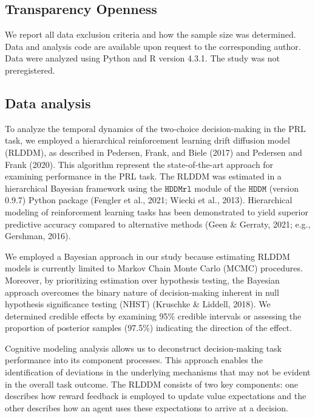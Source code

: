\documentclass[
  man,floatsintext]{apa6}
\begin{document}
\hypertarget{transparency-openness}{%
\subsection{Transparency Openness}\label{transparency-openness}}

We report all data exclusion criteria and how the sample size was determined. Data and analysis code are available upon request to the corresponding author. Data were analyzed using Python and R version 4.3.1. The study was not preregistered.

\hypertarget{data-analysis}{%
\subsection{Data analysis}\label{data-analysis}}

To analyze the temporal dynamics of the two-choice decision-making in the PRL task, we employed a hierarchical reinforcement learning drift diffusion model (RLDDM), as described in Pedersen, Frank, and Biele (2017) and Pedersen and Frank (2020). This algorithm represent the state-of-the-art approach for examining performance in the PRL task. The RLDDM was estimated in a hierarchical Bayesian framework using the \(\texttt{HDDMrl}\) module of the \(\texttt{HDDM}\) (version 0.9.7) Python package (Fengler et al., 2021; Wiecki et al., 2013). Hierarchical modeling of reinforcement learning tasks has been demonstrated to yield superior predictive accuracy compared to alternative methods (Geen \& Gerraty, 2021; e.g., Gershman, 2016).

We employed a Bayesian approach in our study because estimating RLDDM models is currently limited to Markov Chain Monte Carlo (MCMC) procedures. Moreover, by prioritizing estimation over hypothesis testing, the Bayesian approach overcomes the binary nature of decision-making inherent in null hypothesis significance testing (NHST) (Kruschke \& Liddell, 2018). We determined credible effects by examining 95\% credible intervals or assessing the proportion of posterior samples (97.5\%) indicating the direction of the effect.

Cognitive modeling analysis allows us to deconstruct decision-making task performance into its component processes. This approach enables the identification of deviations in the underlying mechanisms that may not be evident in the overall task outcome. The RLDDM consists of two key components: one describes how reward feedback is employed to update value expectations and the other describes how an agent uses these expectations to arrive at a decision.
\end{document}
